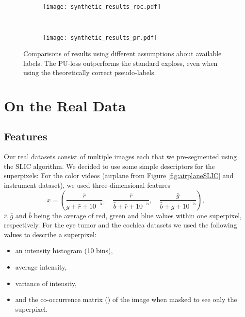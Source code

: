 \begin{figure}[ht]
	\centering
	\begin{subfigure}[h]{0.49\textwidth}
	\texttt{[image: synthetic\_results\_roc.pdf]}	
	\end{subfigure}
	~
	\begin{subfigure}[h]{0.49\textwidth}
	\texttt{[image: synthetic\_results\_pr.pdf]}	
	\end{subfigure}
	\caption{Comparisons of results using different assumptions about available labels. The PU-loss outperforms the standard exploss, even when using the theoretically correct pseudo-labels.}
	\label{fig:synthetic_results}
\end{figure}


\section{On the Real Data}
\label{sec:real-data}
\subsection*{Features}
Our real datasets consist of multiple images each that we pre-segmented using the SLIC algorithm. 
We decided to use some simple descriptors for the superpixels: For the color videos (airplane from Figure \ref{fig:airplaneSLIC} and instrument dataset), we used three-dimensional features
\begin{equation*}
 x = \left( \frac{\bar r}{\bar g + \bar r + 10^{-5}}, \quad \frac{\bar r }{\bar b +\bar r + 10^{-5}}, \quad \frac{\bar g}{ \bar b + \bar g + 10^{-5}}\right),
\end{equation*}
$\bar r, \bar g$ and $\bar b$ being the average of red, green and blue values within one superpixel, respectively. 
For the eye tumor and the cochlea datasets we used the following values to describe a superpixel:
\begin{itemize}
 \item an intensity histogram (10 bins),
 \item average intensity,
 \item variance of intensity,
 \item and the co-occurrence matrix (\cite{haralick1973textural}) of the image when masked to see only the superpixel.
\end{itemize}

